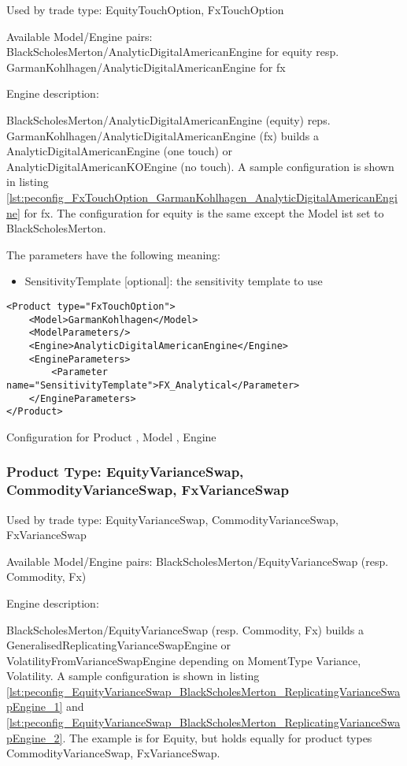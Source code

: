 Used by trade type: EquityTouchOption, FxTouchOption

Available Model/Engine pairs: BlackScholesMerton/AnalyticDigitalAmericanEngine for equity
resp. GarmanKohlhagen/AnalyticDigitalAmericanEngine for fx

Engine description:

BlackScholesMerton/AnalyticDigitalAmericanEngine (equity) reps. GarmanKohlhagen/AnalyticDigitalAmericanEngine (fx)
builds a AnalyticDigitalAmericanEngine (one touch) or AnalyticDigitalAmericanKOEngine (no touch). A sample configuration
is shown in listing \ref{lst:peconfig_FxTouchOption_GarmanKohlhagen_AnalyticDigitalAmericanEngine} for fx. The
configuration for equity is the same except the Model ist set to BlackScholesMerton.

The parameters have the following meaning:

\begin{itemize}
\item SensitivityTemplate [optional]: the sensitivity template to use 
\end{itemize}

\begin{longlisting}
\begin{verbatim}
<Product type="FxTouchOption">
    <Model>GarmanKohlhagen</Model>
    <ModelParameters/>
    <Engine>AnalyticDigitalAmericanEngine</Engine>
    <EngineParameters>
        <Parameter name="SensitivityTemplate">FX_Analytical</Parameter>
    </EngineParameters>
</Product>
\end{verbatim}
\caption{Configuration for Product , Model , Engine }
\label{lst:peconfig_FxTouchOption_GarmanKohlhagen_AnalyticDigitalAmericanEngine}
\end{longlisting}

\subsubsection{Product Type: EquityVarianceSwap, CommodityVarianceSwap, FxVarianceSwap}

Used by trade type: EquityVarianceSwap, CommodityVarianceSwap, FxVarianceSwap

Available Model/Engine pairs: BlackScholesMerton/EquityVarianceSwap (resp. Commodity, Fx)

Engine description:

BlackScholesMerton/EquityVarianceSwap (resp. Commodity, Fx) builds a GeneralisedReplicatingVarianceSwapEngine or
VolatilityFromVarianceSwapEngine depending on MomentType Variance, Volatility. A sample configuration is shown in
listing \ref{lst:peconfig_EquityVarianceSwap_BlackScholesMerton_ReplicatingVarianceSwapEngine_1} and
\ref{lst:peconfig_EquityVarianceSwap_BlackScholesMerton_ReplicatingVarianceSwapEngine_2}. The example is for Equity, but
holds equally for product types CommodityVarianceSwap, FxVarianceSwap.

